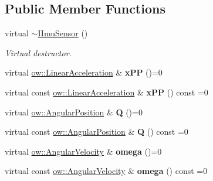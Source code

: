\subsection*{Public Member Functions}
\begin{DoxyCompactItemize}
\item 
virtual \hyperlink{classow__core_1_1IImuSensor_adf850e4311f4f949b64052bad6dabaa8}{$\sim$\+I\+Imu\+Sensor} ()\hypertarget{classow__core_1_1IImuSensor_adf850e4311f4f949b64052bad6dabaa8}{}\label{classow__core_1_1IImuSensor_adf850e4311f4f949b64052bad6dabaa8}

\begin{DoxyCompactList}\small\item\em Virtual destructor. \end{DoxyCompactList}\item 
virtual \hyperlink{classow__core_1_1LinearAcceleration}{ow\+::\+Linear\+Acceleration} \& {\bfseries x\+PP} ()=0\hypertarget{classow__core_1_1IImuSensor_ae68fcb47b685e976a9f0d219e4da6161}{}\label{classow__core_1_1IImuSensor_ae68fcb47b685e976a9f0d219e4da6161}

\item 
virtual const \hyperlink{classow__core_1_1LinearAcceleration}{ow\+::\+Linear\+Acceleration} \& {\bfseries x\+PP} () const =0\hypertarget{classow__core_1_1IImuSensor_afa23e2e8bc955e1684838a5702084e69}{}\label{classow__core_1_1IImuSensor_afa23e2e8bc955e1684838a5702084e69}

\item 
virtual \hyperlink{classow__core_1_1AngularPosition}{ow\+::\+Angular\+Position} \& {\bfseries Q} ()=0\hypertarget{classow__core_1_1IImuSensor_a33f9c0749e9b51a160f3e9f7d994a3cf}{}\label{classow__core_1_1IImuSensor_a33f9c0749e9b51a160f3e9f7d994a3cf}

\item 
virtual const \hyperlink{classow__core_1_1AngularPosition}{ow\+::\+Angular\+Position} \& {\bfseries Q} () const =0\hypertarget{classow__core_1_1IImuSensor_a259e35ca45ee2f2f53f87131c4ebb43e}{}\label{classow__core_1_1IImuSensor_a259e35ca45ee2f2f53f87131c4ebb43e}

\item 
virtual \hyperlink{classow__core_1_1AngularVelocity}{ow\+::\+Angular\+Velocity} \& {\bfseries omega} ()=0\hypertarget{classow__core_1_1IImuSensor_ac64f3738634e3d481adeb4d6b136e770}{}\label{classow__core_1_1IImuSensor_ac64f3738634e3d481adeb4d6b136e770}

\item 
virtual const \hyperlink{classow__core_1_1AngularVelocity}{ow\+::\+Angular\+Velocity} \& {\bfseries omega} () const =0\hypertarget{classow__core_1_1IImuSensor_a001199e72daea895d5d27ad408075c28}{}\label{classow__core_1_1IImuSensor_a001199e72daea895d5d27ad408075c28}

\end{DoxyCompactItemize}


